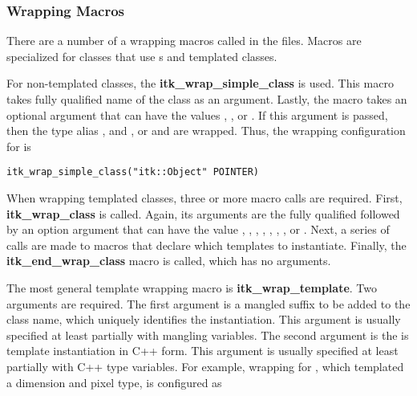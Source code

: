\subsubsection{Wrapping Macros}

There are a number of a wrapping macros called in the 
files. Macros are specialized for classes that use s
and templated classes.

For non-templated classes, the \textbf{itk\_wrap\_simple\_class} is used. This
macro takes fully qualified name of the class as an argument. Lastly, the
macro takes an optional argument that can have the values ,
, or . If
this argument is passed, then the type alias ,
 and , or
 and  are
wrapped. Thus, the wrapping configuration for  is

\begin{verbatim}
itk_wrap_simple_class("itk::Object" POINTER)
\end{verbatim}

When wrapping templated classes, three or more macro calls are required.
First, \textbf{itk\_wrap\_class} is called.  Again, its arguments are the
fully qualified followed by an option argument that can have the value
, ,
, ,
,
, , or
. Next, a series of calls are made to macros that declare
which templates to instantiate. Finally, the \textbf{itk\_end\_wrap\_class}
macro is called, which has no arguments.

The most general template wrapping macro is \textbf{itk\_wrap\_template}. Two
arguments are required. The first argument is a mangled suffix to be added to
the class name, which uniquely identifies the instantiation. This argument is usually
specified at least partially with  mangling
variables. The second argument is the is template instantiation in C++ form.
This argument is usually specified at least partially with 
C++ type variables. For example, wrapping for
, which templated a dimension and pixel type, is
configured as

